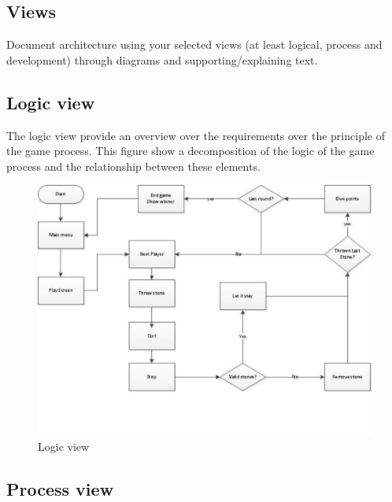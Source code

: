 \subsection{Views}

Document architecture using your selected views (at least logical, process and development) through diagrams and supporting/explaining text.	

\subsection{Logic view} 
The logic view provide an overview over the requirements over the principle of the game process. This figure show a decomposition of the logic of the game process and the relationship between these elements.

\begin{figure}[ht!]
	\centering
	\includegraphics[width=150mm]{view.jpg}
	\caption{Logic view}
	\label{fig:view}
\end{figure}

\subsection{Process view}


